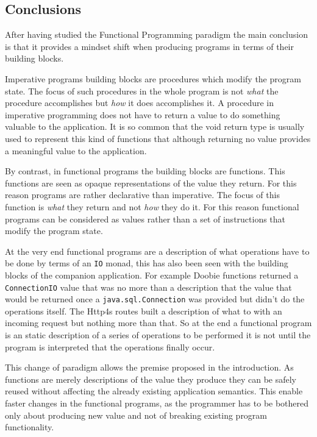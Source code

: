 \documentclass[../main.tex]{subfiles}
\begin{document}
\subsection{Conclusions}
After having studied the Functional Programming paradigm the main conclusion is
that it provides a mindset shift when producing programs in terms of their
building blocks.

Imperative programs building blocks are procedures which modify the program
state. The focus of such procedures in the whole program is not \textit{what} the
procedure accomplishes but \textit{how} it does accomplishes it. A procedure in
imperative programming does not have to return a value to do something valuable
to the application. It is so common that the void return type is usually used to
represent this kind of functions that although returning no value provides a
meaningful value to the application.

By contrast, in functional programs the building blocks are functions. This
functions are seen as opaque representations of the value they return. For this
reason programs are rather declarative than imperative. The focus of this
function is \textit{what} they return and not \textit{how} they do it. For this
reason functional programs can be considered as values rather than a set of
instructions that modify the program state.

At the very end functional programs are a description of what operations have to
be done by terms of an \texttt{IO} monad, this has also been seen with the
building blocks of the companion application. For example Doobie functions
returned a \texttt{ConnectionIO} value that was no more than a description that
the value that would be returned once a \texttt{java.sql.Connection} was
provided but didn't do the operations itself. The Http4s routes built a
description of what to with an incoming request but nothing more than that. So
at the end a functional program is an static description of a series of
operations to be performed it is not until the program is interpreted that the
operations finally occur.

This change of paradigm allows the premise proposed in the introduction. As
functions are merely descriptions of the value they produce they can be safely
reused without affecting the already existing application semantics. This enable
faster changes in the functional programs, as the programmer has to be bothered
only about producing new value and not of breaking existing program
functionality.
\end{document}
